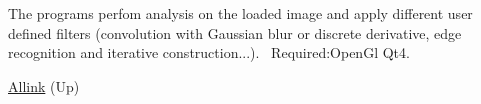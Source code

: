 The programs perfom analysis on the loaded image and apply different user defined filters (convolution with Gaussian blur or discrete derivative, edge recognition and iterative construction...).~\newline
 Required\+:Open\+Gl Qt4.


\begin{DoxyItemize}
\item \hyperlink{index}{Allink} (Up)  
\end{DoxyItemize}